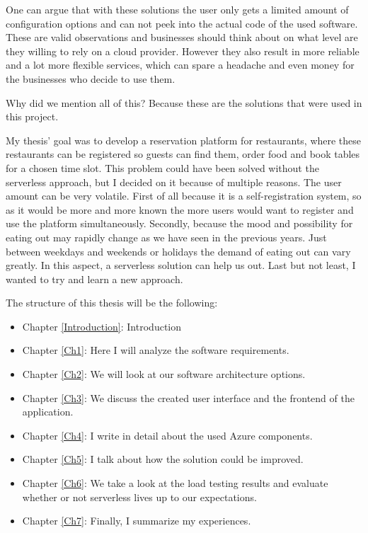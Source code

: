 One can argue that with these solutions the user only gets a limited amount of configuration options and can not peek into the actual code of the used software. These are valid observations and businesses should think about on what level are they willing to rely on a cloud provider. However they also result in more reliable and a lot more flexible services, which can spare a headache and even money for the businesses who decide to use them.

Why did we mention all of this? Because these are the solutions that were used in this project.

My thesis' goal was to develop a reservation platform for restaurants, where these restaurants can be registered so guests can find them, order food and book tables for a chosen time slot. 
This problem could have been solved without the serverless approach, but I decided on it because of multiple reasons. The user amount can be very volatile. First of all because it is a self-registration system, so as it would be more and more known the more users would want to register and use the platform simultaneously. Secondly, because the mood and possibility for eating out may rapidly change as we have seen in the previous years. Just between weekdays and weekends or holidays the demand of eating out can vary greatly. In this aspect, a serverless solution can help us out. Last but not least, I wanted to try and learn a new approach.

The structure of this thesis will be the following: 
 \begin{itemize}
 	\item Chapter \ref{Introduction}: Introduction
	\item Chapter \ref{Ch1}: Here I will analyze the software requirements. 
	\item Chapter \ref{Ch2}: We will look at our software architecture options.
	\item Chapter \ref{Ch3}: We discuss the created user interface and the frontend of the application.
	\item Chapter \ref{Ch4}: I write in detail about the used Azure components.
	\item Chapter \ref{Ch5}: I talk about how the solution could be improved.
	\item Chapter \ref{Ch6}: We take a look at the load testing results and evaluate whether or not serverless lives up to our expectations.
	\item Chapter \ref{Ch7}: Finally, I summarize my experiences.
\end{itemize}